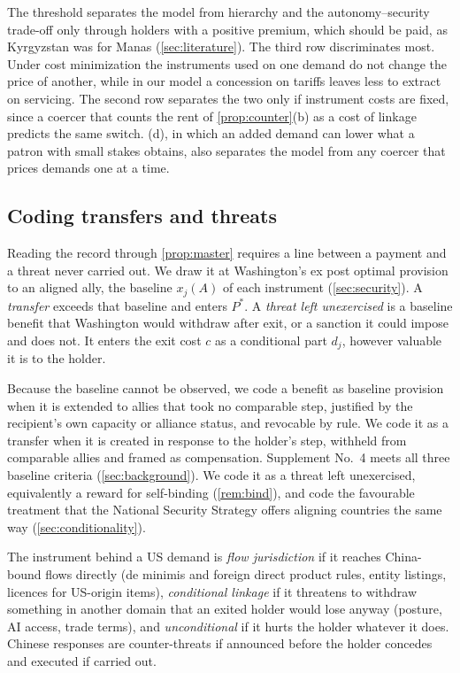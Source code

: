 The threshold separates the model from hierarchy and the autonomy--security trade-off only through holders with a positive premium, which should be paid, as Kyrgyzstan was for Manas (\cref{sec:literature}). The third row discriminates most. Under cost minimization the instruments used on one demand do not change the price of another, while in our model a concession on tariffs leaves less to extract on servicing. The second row separates the two only if instrument costs are fixed, since a coercer that counts the rent of \cref{prop:counter}(b) as a cost of linkage predicts the same switch. (d), in which an added demand can lower what a patron with small stakes obtains, also separates the model from any coercer that prices demands one at a time.

\subsection{Coding transfers and threats}\label{sec:coding}

Reading the record through \cref{prop:master} requires a line between a payment and a threat never carried out. We draw it at Washington's ex post optimal provision to an aligned ally, the baseline $x_j(A)$ of each instrument (\cref{sec:security}). A \emph{transfer} exceeds that baseline and enters $P^*$. A \emph{threat left unexercised} is a baseline benefit that Washington would withdraw after exit, or a sanction it could impose and does not. It enters the exit cost $c$ as a conditional part $d_j$, however valuable it is to the holder.

Because the baseline cannot be observed, we code a benefit as baseline provision when it is extended to allies that took no comparable step, justified by the recipient's own capacity or alliance status, and revocable by rule. We code it as a transfer when it is created in response to the holder's step, withheld from comparable allies and framed as compensation. Supplement No.~4 meets all three baseline criteria (\cref{sec:background}). We code it as a threat left unexercised, equivalently a reward for self-binding (\cref{rem:bind}), and code the favourable treatment that the National Security Strategy offers aligning countries the same way (\cref{sec:conditionality}).

The instrument behind a US demand is \emph{flow jurisdiction} if it reaches China-bound flows directly (de minimis and foreign direct product rules, entity listings, licences for US-origin items), \emph{conditional linkage} if it threatens to withdraw something in another domain that an exited holder would lose anyway (posture, AI access, trade terms), and \emph{unconditional} if it hurts the holder whatever it does. Chinese responses are counter-threats if announced before the holder concedes and executed if carried out.

